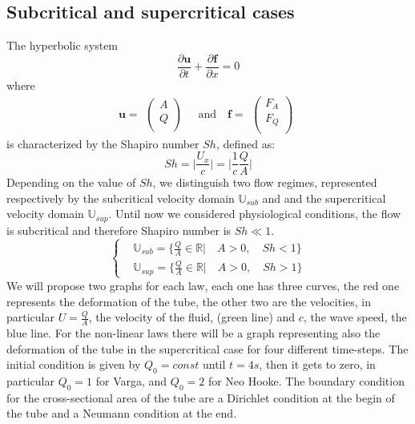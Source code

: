 \documentclass[12pt,a4paper]{article}
\numberwithin{equation}{section}
\begin{document}
\subsection{Subcritical and supercritical cases}
\label{sec:shapiro}
The hyperbolic system
\begin{equation*}
\frac{\partial \boldsymbol{u}}{\partial t} + \frac{\partial \boldsymbol{f}}{\partial x} = 0
\end{equation*}
where
\begin{equation}
\boldsymbol{u} = 
\begin{matrix}
\begin{pmatrix}
A \\
Q \\
\end{pmatrix}
\end{matrix}
\quad \textrm{and} \quad \boldsymbol{f}= 
\begin{matrix}
\begin{pmatrix}
F_A\\
F_Q\\
\end{pmatrix}
\end{matrix}
\end{equation}
is characterized by the Shapiro number $Sh$, defined as:
\begin{equation}
Sh = \Big| \frac{U_x}{c} \Big| = \Big| \frac{1}{c}\frac{Q}{A} \Big|
\end{equation}
Depending on the value of $Sh$, we distinguish two flow regimes, represented respectively by the subcritical velocity domain $\mathbb{U}_{sub}$ and and the supercritical velocity domain $\mathbb{U}_{sup}$. Until now we considered physiological conditions, the flow is subcritical and therefore Shapiro number is $Sh \ll 1$.
\begin{equation*}
	\left\{
      \begin{aligned}
       &  \mathbb{U}_{sub} = \Big\{\frac{Q}{A} \in \mathbb{R} |\quad A > 0,\quad Sh < 1 \Big\}\\
       & \mathbb{U}_{sup} = \Big\{\frac{Q}{A} \in \mathbb{R}|\quad A > 0,\quad Sh > 1 \Big\}
      \end{aligned}
    \right.
\end{equation*}
We will propose two graphs for each law, each one has three curves, the red one represents the deformation of the tube, the other two are the velocities, in particular $U = \frac{Q}{A}$, the velocity of the fluid, (green line) and $c$, the wave speed, the blue line. For the non-linear laws there will be a graph representing also the deformation of the tube in the supercritical case for four different time-steps. The initial condition is given by $Q_0 = const$ until $t = 4s$, then it gets to zero, in particular  $Q_0 = 1$ for Varga, and $Q_0 = 2$ for Neo Hooke. The boundary condition for the cross-sectional area of the tube are a Dirichlet condition at the begin of the tube and a Neumann condition at the end.
\end{document}
